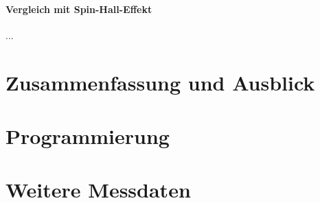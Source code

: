 \documentclass[titlepage]{article}
\begin{document}
	\paragraph{Vergleich mit Spin-Hall-Effekt}
	...
	\section{Zusammenfassung und Ausblick}
	
	\newpage
	\appendix
	
	\section{Programmierung}
	\section{Weitere Messdaten}
\end{document}
